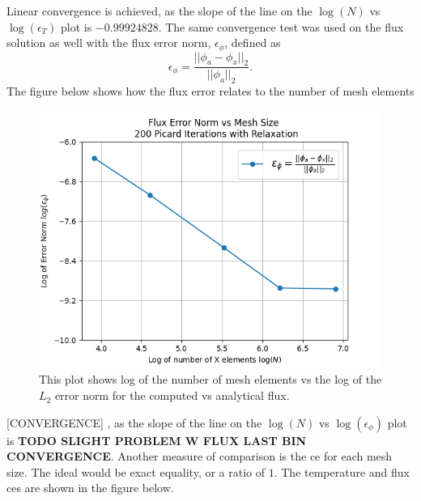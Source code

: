 \documentclass[letterpaper]{mc2023}
\begin{document}
Linear convergence is achieved, as the slope of the line on the $\log(N)$ vs $\log(\epsilon_{T})$ plot is $-0.99924828$. The same convergence test
was used on the flux solution as well with the flux error norm, $\epsilon_{\phi}$, defined as
\begin{equation}
    \epsilon_{\phi} =  \frac{|| \phi_{a} - \phi_{x} ||_{2}}{|| \phi_{a} ||_{2}}.
\end{equation}
The figure below shows how the flux error relates to the number of mesh elements
\begin{figure}[H]
    \centering
    \includegraphics[width=0.45\linewidth]{figures/flux_error_norms.png}
    \caption{This plot shows log of the number of mesh elements vs the log of the $L_{2}$ error norm for the computed vs analytical flux.}
    \label{fig:flux_error_study}
\end{figure}
[CONVERGENCE] , as the slope of the line on the $\log(N)$ vs $\log(\epsilon_{\phi})$ plot is \textbf{TODO SLIGHT PROBLEM W FLUX LAST BIN CONVERGENCE}.
Another measure of comparison is the \gls{ce} for each mesh size. The ideal would be exact equality, or a ratio of $1$. The temperature
and flux \glspl{ce} are shown in the figure below.
\end{document}
